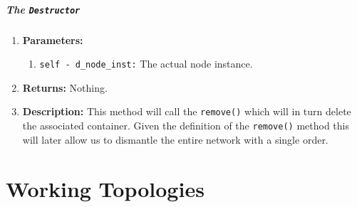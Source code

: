                     \subparagraph{The \texttt{Destructor}}
                        \begin{enumerate}
                            \item \textbf{Parameters:}
                            \begin{enumerate}
                                \item \texttt{self - d\_node\_inst:} The actual node instance.
                            \end{enumerate}
                            \item \textbf{Returns:} Nothing.
                            \item \textbf{Description:} This method will call the \texttt{remove()} which will in turn delete the associated container. Given the definition of the \texttt{remove()} method this will later allow us to dismantle the entire network with a single order.
                        \end{enumerate}

    \section{Working Topologies}
